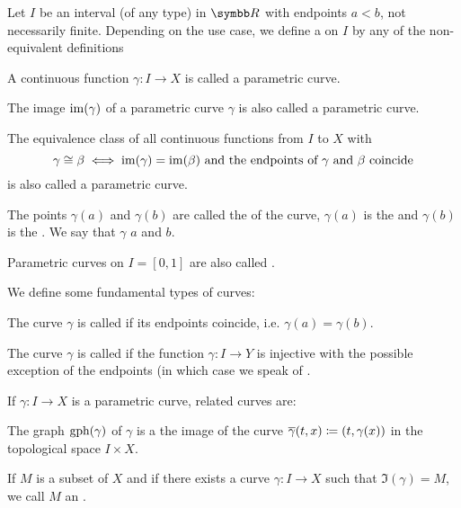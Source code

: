 \begin{definition}\label{def:parametric_curve}
   Let \( I \) be an interval (of any type) in \( \BR \) with endpoints \( a < b \), not necessarily finite. Depending on the use case, we define a  on \( I \) by any of the non-equivalent definitions

  \begin{defenum}
     A continuous function \( \gamma: I \to X \) is called a parametric curve.

     The image \( \operatorname{im}(\gamma) \) of a parametric curve \( \gamma \) is also called a parametric curve.

     The equivalence class of all continuous functions from \( I \) to \( X \) with
    \begin{equation*}
      \gamma \cong \beta \iff \operatorname{im}(\gamma) = \operatorname{im}(\beta) \text{ and the endpoints of } \gamma \text{ and } \beta \text{ coincide}
    \end{equation*}
    is also called a parametric curve.
  \end{defenum}

  The points \( \gamma(a) \) and \( \gamma(b) \) are called the  of the curve, \( \gamma(a) \) is the  and \( \gamma(b) \) is the . We say that \( \gamma \)  \( a \) and \( b \).

  Parametric curves on \( I = [0, 1] \) are also called .

  We define some fundamental types of curves:
  \begin{defenum}
     The curve \( \gamma \) is called  if its endpoints coincide, i.e. \( \gamma(a) = \gamma(b) \).

     The curve \( \gamma \) is called  if the function \( \gamma: I \to Y \) is injective with the possible exception of the endpoints (in which case we speak of .
  \end{defenum}

  If \( \gamma: I \to X \) is a parametric curve, related curves are:
  \begin{defenum}
    \cite[definition 1.20]{Иванов2017} The graph \( \operatorname{gph}(\gamma) \) of \( \gamma \) is a the image of the curve \( \overline{\gamma}(t, x) \coloneqq (t, \gamma(x)) \) in the topological space \( I \times X \).

    \cite[definition 1.24]{Иванов2017} If \( M \) is a subset of \( X \) and if there exists a curve \( \gamma: I \to X \) such that \( \Im(\gamma) = M \), we call \( M \) an .
  \end{defenum}
\end{definition}

